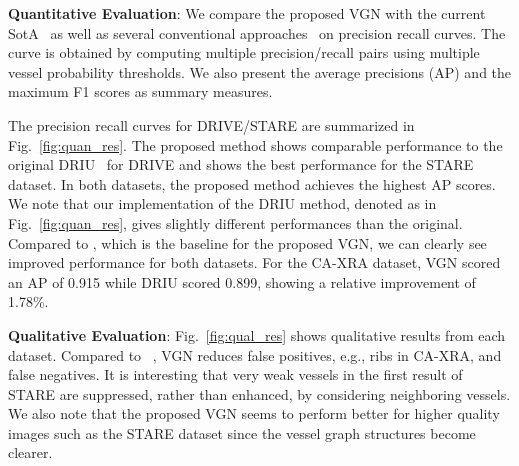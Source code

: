 \documentclass[runningheads,a4paper]{llncs}
\begin{document}
\textbf{Quantitative Evaluation}:
We compare the proposed VGN with the current SotA~\cite{maninis16,ganin14,fu16} as well as several conventional approaches~\cite{soares06,orlando14,becker13} on precision recall curves. The curve is obtained by computing multiple precision/recall pairs using multiple vessel probability thresholds. We also present the average precisions (AP) and the maximum F1 scores as summary measures. 

The precision recall curves for DRIVE/STARE are summarized in Fig.~\ref{fig:quan_res}. The proposed method shows comparable performance to the original DRIU~\cite{maninis16} for DRIVE and shows the best performance for the STARE dataset. In both datasets, the proposed method achieves the highest AP scores. We note that our implementation of the DRIU method, denoted as  in Fig.~\ref{fig:quan_res}, gives slightly different performances than the original. Compared to , which is the baseline for the proposed VGN, we can clearly see improved performance for both datasets. For the CA-XRA dataset, VGN scored an AP of 0.915 while DRIU scored 0.899, showing a relative improvement of 1.78\%.

\textbf{Qualitative Evaluation}:
Fig.~\ref{fig:qual_res} shows qualitative results from each dataset. Compared to ~\cite{maninis16}, VGN reduces false positives, e.g., ribs in CA-XRA, and false negatives. It is interesting that very weak vessels in the first result of STARE are suppressed, rather than enhanced, by considering neighboring vessels. We also note that the proposed VGN seems to perform better for higher quality images such as the STARE dataset since the vessel graph structures become clearer.
\end{document}
